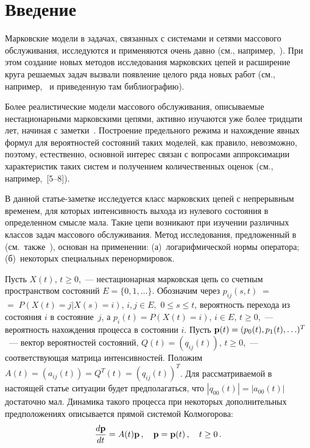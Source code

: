       \begin{multicols}{2}

      \label{st\stat}

\section{Введение}

Марковские модели в задачах, связанных с сис\-те\-ма\-ми и сетями
массового обслуживания, исследуются и применяются очень давно
(см., например,~\cite{bha, bp}). При этом создание новых методов\linebreak
исследования марковских цепей  и расширение круга решаемых задач
вызвали появление целого ряда новых работ (см., например,~\cite{cn}
и приведенную там библиографию).

Более реалистические модели массового обслу\-живания, описываемые
нестационарными мар\-ковскими цепями, активно изучаются уже более
три\-дца\-ти лет, начиная с заметки~\cite{gm}. Построение предельного
режима и нахождение явных формул для вероятностей состояний таких
моделей, как правило, невозможно, поэтому, естественно, основной
интерес связан с вопросами аппроксимации характеристик таких систем
и получением количественных оценок (см., например,~[5--8]).

В данной статье-заметке исследуется класс марковских цепей с
непрерывным временем, для которых интенсивность выхода из нулевого
состояния в определенном смысле мала.  Такие цепи возникают при
изучении различных классов задач массового обслуживания. Метод
исследования, предложенный в~\cite{z95} (см.\ также~\cite{z08}),
основан на применении: (а)~логарифмической нормы оператора; (б)~некоторых
специальных перенормировок.

\medskip
Пусть $X(t)$,  $t\geq 0$,~--- нестационарная марковская цепь со
счетным прост\-ранст\-вом состояний $E=\{0,1,\ldots \}$. Обозначим
через $p_{ij}(s,t)\;=$\linebreak $=\;P(X(t)=j | X(s)=i)$, $i,j\in E,$ $0\leq s\leq
t$, вероятность перехода из состояния $i$ в состояние~$j$, а
$p_{i}(t)=P(X(t)=i)$, $i\in E$, $t\geq 0$,~--- вероятность
нахождения процесса в состоянии $i$. Пусть ${\bf
p}(t)=(p_{0}(t),p_{1}(t),\ldots )^{T}$~--- вектор вероятностей
состояний, $Q(t)=(q_{ij}(t))$,  $t\geq 0$,~--- соответствующая
матрица интенсивностей. Положим
$A(t)=(a_{ij}(t))=Q^{T}(t)=(q_{ij}(t))^{T}$. Для рассматриваемой в
настоящей статье ситуации  будет предполагаться, что
$|q_{00}(t)|=|a_{00}(t)|$ достаточно мал. Динамика такого процесса
при некоторых дополнительных предположениях описывается прямой
системой Колмогорова:
\begin{equation}
  \displaystyle\frac{\displaystyle d {\bf p}\mathstrut}{\displaystyle dt\mathstrut}=A(t){\bf p}\,,\quad {\bf p}={\bf p}(t)\,,\quad
t\geq 0\,. \label{01}
\end{equation}


\end{multicols}
